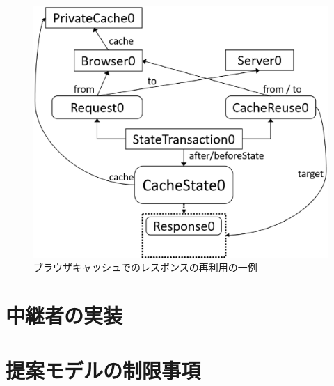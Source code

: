 \documentclass[12pt,a4paper]{jbook}
\begin{document}
\begin{figure}[htb]
\centering
\includegraphics[width=450pt]{./fig/BrowserCacheReuse.eps}
\caption{ブラウザキャッシュでのレスポンスの再利用の一例}
\label{fig:BrowserCacheReuse}
\end{figure}

\color{black}

\section{中継者の実装}
\section{提案モデルの制限事項}
\end{document}
